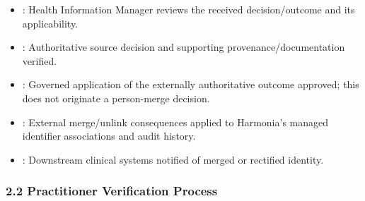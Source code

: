 \begin{itemize}
\begin{itemize}
\item
\texttt{}: Health Information Manager reviews the received decision/\allowbreak{}outcome and its applicability.



\item
\texttt{}: Authoritative source decision and supporting provenance/\allowbreak{}documentation verified.



\item
\texttt{}: Governed application of the externally authoritative outcome approved; this does not originate a person-merge decision.



\item
\texttt{}: External merge/\allowbreak{}unlink consequences applied to Harmonia's managed identifier associations and audit history.



\item
\texttt{}: Downstream clinical systems notified of merged or rectified identity.



\end{itemize}


\end{itemize}
\label{rad:processes:83}

\par\smallskip
{}\label{rad:processes:85}
\subsubsection*{2.2 Practitioner Verification Process}
\label{rad:processes:86}

